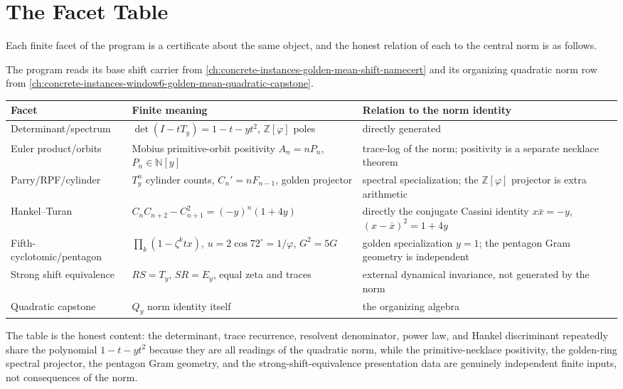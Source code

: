 \section{The Facet Table}
\label{sec:window6-zeta-program-table}

Each finite facet of the program is a certificate about the same object, and the honest relation of each to the central norm is as follows.

The program reads its base shift carrier from \autoref{ch:concrete-instances-golden-mean-shift-namecert} and its organizing quadratic norm row from \autoref{ch:concrete-instances-window6-golden-mean-quadratic-capstone}.

\begin{center}
\begin{tabular}{@{}lll@{}}
\textbf{Facet} & \textbf{Finite meaning} & \textbf{Relation to the norm identity}\\
\hline
Determinant/spectrum & $\det(I-tT_y)=1-t-yt^2$, $\mathbb Z[\varphi]$ poles & directly generated\\
Euler product/orbits & Mobius primitive-orbit positivity $A_n=nP_n$, $P_n\in\mathbb N[y]$ & trace-log of the norm; positivity is a separate necklace theorem\\
Parry/RPF/cylinder & $T_y^n$ cylinder counts, $C_n'=nF_{n-1}$, golden projector & spectral specialization; the $\mathbb Z[\varphi]$ projector is extra arithmetic\\
Hankel--Turan & $C_nC_{n+2}-C_{n+1}^2=(-y)^n(1+4y)$ & directly the conjugate Cassini identity $x\bar x=-y$, $(x-\bar x)^2=1+4y$\\
Fifth-cyclotomic/pentagon & $\prod_k(1-\zeta^k t x)$, $u=2\cos72^\circ=1/\varphi$, $G^2=5G$ & golden specialization $y=1$; the pentagon Gram geometry is independent\\
Strong shift equivalence & $RS=T_y$, $SR=E_y$, equal zeta and traces & external dynamical invariance, not generated by the norm\\
Quadratic capstone & $Q_y$ norm identity itself & the organizing algebra\\
\end{tabular}
\end{center}

The table is the honest content: the determinant, trace recurrence, resolvent denominator, power law, and Hankel discriminant repeatedly share the polynomial $1-t-yt^2$ because they are all readings of the quadratic norm, while the primitive-necklace positivity, the golden-ring spectral projector, the pentagon Gram geometry, and the strong-shift-equivalence presentation data are genuinely independent finite inputs, not consequences of the norm.

